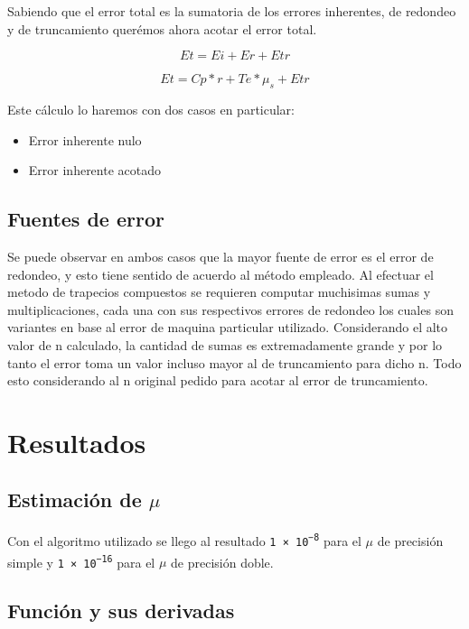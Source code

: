 \documentclass[11pt,a4paper]{article}
\begin{document}
Sabiendo que el error total es la sumatoria de los errores inherentes, de redondeo y de truncamiento querémos ahora acotar el error total.


\begin{equation}
Et = Ei + Er + Etr
\end{equation}


\begin{equation}
    Et = Cp * r + Te * \mu_s + Etr 
\end{equation}


Este cálculo lo haremos con dos casos en particular:

\begin{itemize}
\item Error inherente nulo
\item Error inherente acotado
\end{itemize}

\subsection{Fuentes de error}

Se puede observar en ambos casos que la mayor fuente de error es el error de redondeo, y esto tiene sentido de acuerdo al método empleado. Al efectuar el metodo de trapecios compuestos se requieren computar muchisimas sumas y multiplicaciones, cada una con sus respectivos errores de redondeo los cuales son variantes en base al error de maquina particular utilizado. Considerando el alto valor de n calculado, la cantidad de sumas es extremadamente grande y por lo tanto el error toma un valor incluso mayor al de truncamiento para dicho n. Todo esto considerando al n original pedido para acotar al error de truncamiento.

\section{Resultados}

\subsection{Estimación de \( \mu \) }

Con el algoritmo utilizado se llego al resultado \texttt{\num{1e-8}} para el \(\mu\) de precisión simple y \texttt{\num{1e-16}} para el \(\mu\) de precisión doble.

\subsection{Función y sus derivadas}
\end{document}
